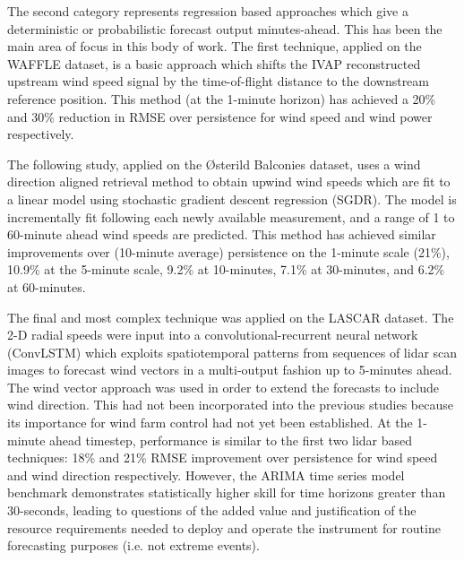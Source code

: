 The second category represents regression based approaches which give a deterministic or probabilistic forecast output minutes-ahead. This has been the main area of focus in this body of work. The first technique, applied on the WAFFLE dataset, is a basic approach which shifts the IVAP reconstructed upstream wind speed signal by the time-of-flight distance to the downstream reference position. This method (at the 1-minute horizon) has achieved a 20\% and 30\% reduction in RMSE over persistence for wind speed and wind power respectively. 

The following study, applied on the {\O}sterild Balconies dataset, uses a wind direction aligned retrieval method to obtain upwind wind speeds which are fit to a linear model using stochastic gradient descent regression (SGDR). The model is incrementally fit following each newly available measurement, and a range of 1 to 60-minute ahead wind speeds are predicted. This method has achieved similar improvements over (10-minute average) persistence on the 1-minute scale (21\%), 10.9\% at the 5-minute scale, 9.2\% at 10-minutes, 7.1\% at 30-minutes, and 6.2\% at 60-minutes. 

The final and most complex technique was applied on the LASCAR dataset. The 2-D radial speeds were input into a convolutional-recurrent neural network (ConvLSTM) which exploits spatiotemporal patterns from sequences of lidar scan images to forecast wind vectors in a multi-output fashion up to 5-minutes ahead. The wind vector approach was used in order to extend the forecasts to include wind direction. This had not been incorporated into the previous studies because its importance for wind farm control had not yet been established. At the 1-minute ahead timestep, performance is similar to the first two lidar based techniques: 18\% and 21\% RMSE improvement over persistence for wind speed and wind direction respectively. However, the ARIMA time series model benchmark demonstrates statistically higher skill for time horizons greater than 30-seconds, leading to questions of the added value and justification of the resource requirements needed to deploy and operate the instrument for routine forecasting purposes (i.e. not extreme events).

